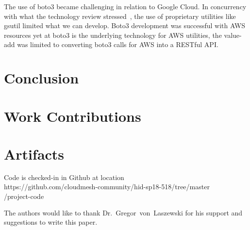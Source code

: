 The use of boto3 became challenging in relation to Google Cloud. In concurrency
with what the technology review stressed~\cite{hid-sp18-518-DataMotion}, the use of proprietary utilities like
gsutil limited what we can develop. Boto3 development was successful with AWS
resources yet at boto3 is the underlying technology for AWS utilities, the
value-add was limited to converting boto3 calls for AWS into a RESTful API.

\section{Conclusion}

\section{Work Contributions}

\section{Artifacts}

Code is checked-in in Github at location \\
https://github.com/cloudmesh-community/hid-sp18-518/tree/master\\
/project-code \\

\begin{acks}

  The authors would like to thank Dr.~Gregor~von~Laszewski for his
  support and suggestions to write this paper.

\end{acks}


 


